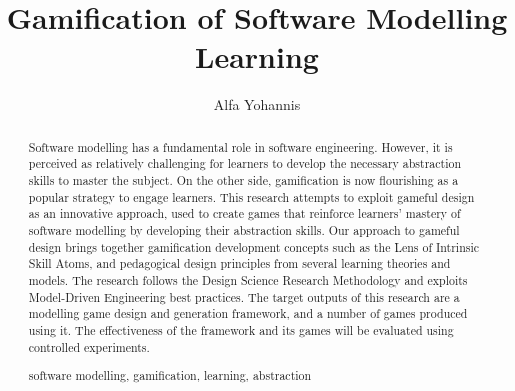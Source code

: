 \documentclass[runningheads,a4paper]{llncs}
\newcommand{\keywords}[1]{\par\addvspace\baselineskip
\noindent\keywordname\enspace\ignorespaces#1}
\begin{document}
\mainmatter %

\title{Gamification of Software Modelling Learning}


%
%
\author{Alfa Yohannis} %
%


%
%

\maketitle

\begin{abstract}
Software modelling has a fundamental role in software engineering. However, it is perceived as relatively challenging for learners to develop the necessary abstraction skills to master the subject. On the other side, gamification is now flourishing as a popular strategy to engage learners. This research attempts to exploit gameful design as an innovative approach, used to create games that reinforce learners' mastery of software modelling by developing their abstraction skills. Our approach to gameful design brings together gamification development concepts such as the Lens of Intrinsic Skill Atoms, and pedagogical design principles from several learning theories and models. The research follows the Design Science Research Methodology and exploits Model-Driven Engineering best practices. The target outputs of this research are a modelling game design and generation framework, and a number of games produced using it. The effectiveness of the framework and its games will be evaluated using controlled experiments.
\keywords{software modelling, gamification, learning, abstraction}
\end{abstract}
\end{document}
